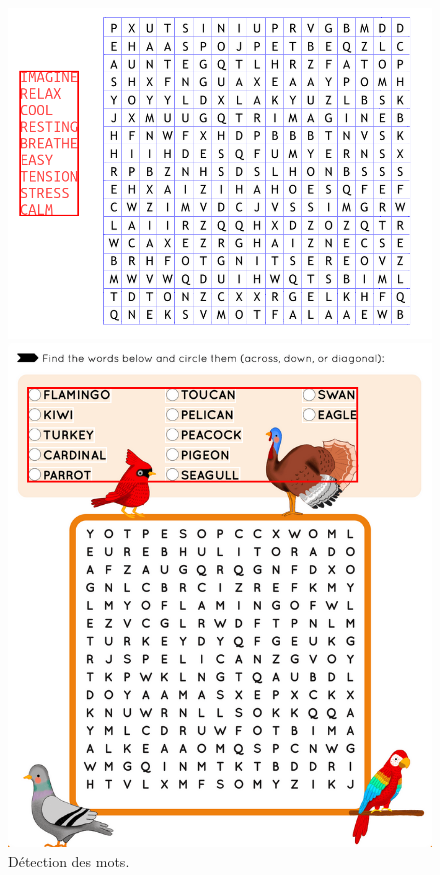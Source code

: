 \documentclass{article}
\begin{document}
\begin{figure}[H]
  \centering
      \includegraphics[width=\linewidth]{ressources/words_with_squares_level_1_image_1.png}
      \caption{}
    \endminipage\quad\quad\quad\quad
    \includegraphics[width=\linewidth]{ressources/words_with_squares_level_3_image_2.png}
    \caption{}
  \endminipage
  \caption{Détection des mots.}
\end{figure}
\end{document}
